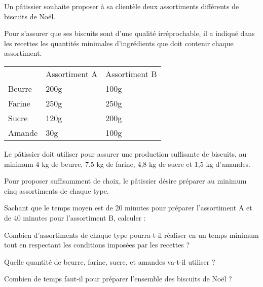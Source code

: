 \begin{exercice}
Un pâtissier souhaite proposer à sa clientèle deux assortiments différents de biscuits de Noël.

Pour s’assurer que ses biscuits sont d’une qualité irréprochable, il a indiqué dans les recettes les quantités minimales d’ingrédients que doit contenir chaque assortiment.

\begin{tabular}{lll}
       & Assortiment A & Assortiment B \\
Beurre & 200g          & 100g          \\
Farine & 250g          & 250g          \\
Sucre  & 120g          & 200g          \\
Amande & 30g           & 100g         
\end{tabular}

Le pâtissier doit utiliser pour assurer une production suffisante de biscuits, au minimum 4 kg de beurre, 7,5 kg de farine, 4,8 kg de sucre et 1,5 kg d’amandes. 

Pour proposer suffisamment de choix, le pâtissier désire préparer au minimum cinq assortiments de chaque type.

Sachant que le temps moyen est de 20 minutes pour préparer l'assortiment A et de 40 minutes pour l'assortiment B, calculer :

Combien d'assortiments de chaque type pourra-t-il réaliser en un temps minimum tout en respectant les conditions imposées par les recettes ?

Quelle quantité de beurre, farine, sucre, et amandes va-t-il utiliser ?

Combien de temps faut-il pour préparer l'ensemble des biscuits de Noël ?
\end{exercice}